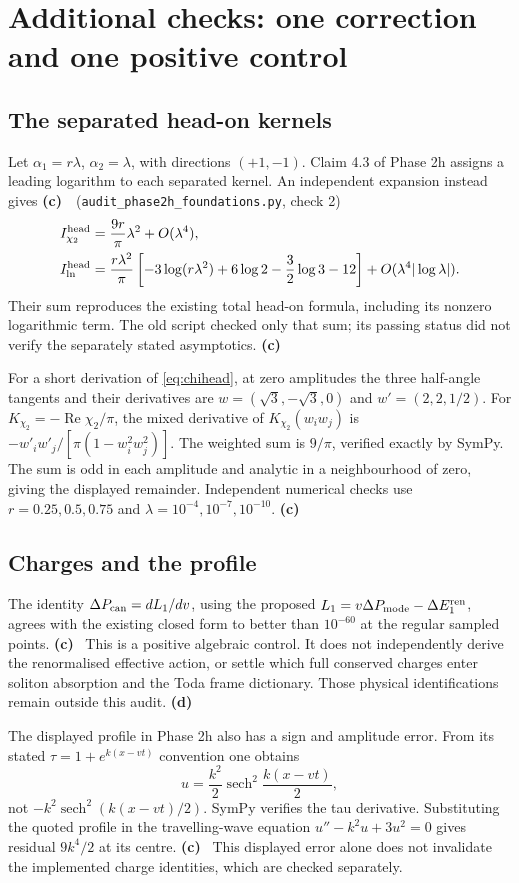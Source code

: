 \documentclass[11pt,a4paper]{article}
\newcommand{\Lc}{\textsf{\textbf{(c)}}\ }
\newcommand{\Ld}{\textsf{\textbf{(d)}}\ }
\newcommand{\scr}{\texttt{audit\_\allowbreak phase2h\_\allowbreak foundations.py}}
\begin{document}
\section{Additional checks: one correction and one positive control}
\subsection{The separated head-on kernels}
Let $\alpha_1=r\lambda$, $\alpha_2=\lambda$, with directions $(+1,-1)$.
Claim 4.3 of Phase 2h assigns a leading logarithm to each separated kernel.
An independent expansion instead gives \Lc\ (\scr, check 2)
\begin{align}
 I_{\chi_2}^{\rm head}
 &=\frac{9r}{\pi}\lambda^2+O(\lambda^4),\label{eq:chihead}\\
 I_{\ln}^{\rm head}
 &=\frac{r\lambda^2}{\pi}
 \left[-3\log(r\lambda^2)+6\log2-\frac32\log3-12\right]
       +O(\lambda^4|\log\lambda|).
 \label{eq:loghead}
\end{align}
Their sum reproduces the existing total head-on formula, including its
nonzero logarithmic term. The old script checked only that sum; its passing
status did not verify the separately stated asymptotics. \Lc

For a short derivation of \eqref{eq:chihead}, at zero amplitudes the three
half-angle tangents and their derivatives are
$w=(\sqrt3,-\sqrt3,0)$ and $w'=(2,2,1/2)$. For
$K_{\chi_2}=-\operatorname{Re}\chi_2/\pi$, the mixed derivative of
$K_{\chi_2}(w_iw_j)$ is
$-w'_iw'_j/[\pi(1-w_i^2w_j^2)]$. The weighted sum is $9/\pi$, verified
exactly by SymPy. The sum is odd in each amplitude and analytic in a
neighbourhood of zero, giving the displayed remainder. Independent numerical
checks use $r=0.25,0.5,0.75$ and $\lambda=10^{-4},10^{-7},10^{-10}$. \Lc

\subsection{Charges and the profile}
The identity $\Delta P_{\rm can}=dL_1/dv$, using the proposed
$L_1=v\Delta P_{\rm mode}-\Delta E_1^{\rm ren}$, agrees with the existing
closed form to better than $10^{-60}$ at the regular sampled points. \Lc
This is a positive algebraic control. It does not independently derive the
renormalised effective action, or settle which full conserved charges enter
soliton absorption and the Toda frame dictionary. Those physical
identifications remain outside this audit. \Ld

The displayed profile in Phase 2h also has a sign and amplitude error. From
its stated $\tau=1+e^{k(x-vt)}$ convention one obtains
\[
 u=\frac{k^2}{2}\operatorname{sech}^2\frac{k(x-vt)}2,
\]
not $-k^2\operatorname{sech}^2(k(x-vt)/2)$. SymPy verifies the tau derivative.
Substituting the quoted profile in the travelling-wave equation
$u''-k^2u+3u^2=0$ gives residual $9k^4/2$ at its centre. \Lc
This displayed error alone does not invalidate the implemented charge
identities, which are checked separately.
\end{document}
